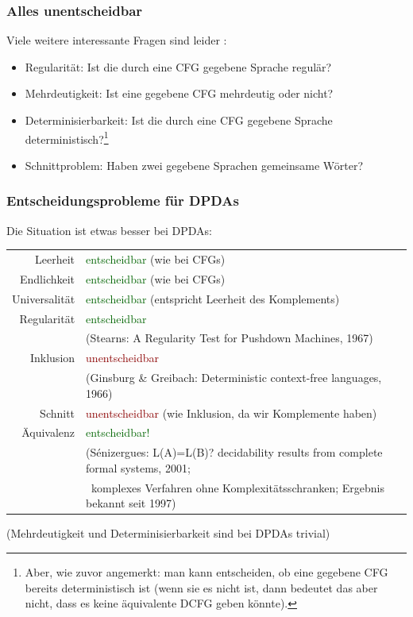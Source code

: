 \documentclass[aspectratio=1610,onlymath]{beamer}
\begin{document}
\begin{frame}\frametitle{Alles unentscheidbar}

Viele weitere interessante Fragen sind leider :

\begin{itemize}
\item \alert{Regularität:} Ist die durch eine CFG gegebene Sprache regulär?
\item \alert{Mehrdeutigkeit:} Ist eine gegebene CFG mehrdeutig oder nicht?
\item \alert{Determinisierbarkeit:} Ist die durch eine CFG gegebene Sprache deterministisch?\footnote{Aber, wie zuvor angemerkt: man kann entscheiden, ob eine gegebene CFG bereits deterministisch ist
(wenn sie es nicht ist, dann bedeutet das aber nicht, dass es keine äquivalente DCFG geben könnte).}
\item \alert{Schnittproblem:} Haben zwei gegebene Sprachen gemeinsame Wörter?
\end{itemize}


\end{frame}

\begin{frame}\frametitle{Entscheidungsprobleme für DPDAs}

Die Situation ist etwas besser bei DPDAs:
\bigskip

\begin{tabular}{rl}
Leerheit & \textcolor{darkgreen}{entscheidbar} {\tiny(wie bei CFGs)}\\
Endlichkeit & \textcolor{darkgreen}{entscheidbar} {\tiny(wie bei CFGs)} \\\pause
Universalität & \pause\textcolor{darkgreen}{entscheidbar} {\tiny(entspricht Leerheit des Komplements)}\\\pause
Regularität & \textcolor{darkgreen}{entscheidbar}\\[-1.5ex]
	& {\tiny (Stearns: A Regularity Test for Pushdown Machines, 1967)}\pause\\[-1ex]
Inklusion  & \textcolor{darkred}{unentscheidbar}\\[-1.5ex]
	& {\tiny (Ginsburg \& Greibach: Deterministic context-free languages, 1966)}\pause\\[-1ex]
Schnitt & \pause\textcolor{darkred}{unentscheidbar} {\tiny(wie Inklusion, da wir Komplemente haben)}\\\pause
Äquivalenz  \pause& \textcolor{darkgreen}{entscheidbar!}\\[-1.5ex]
	& {\tiny (S\'{e}nizergues: L(A)=L(B)? decidability results from complete formal systems, 2001;}\\[-1.5ex]
	& {\tiny ~komplexes Verfahren ohne Komplexitätsschranken; Ergebnis bekannt seit 1997)}\\[-1ex]
\end{tabular}\bigskip

(Mehrdeutigkeit und Determinisierbarkeit sind bei DPDAs trivial)

\end{frame}
\end{document}
